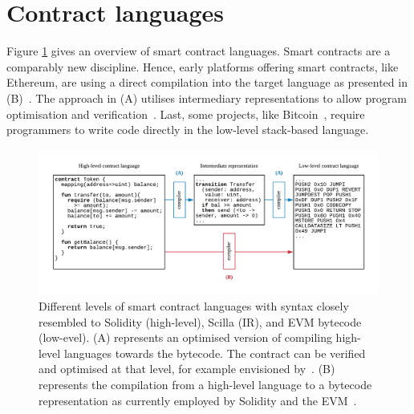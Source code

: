 \section{Contract languages}
\label{languages}

Figure \ref{fig:languagediagram} gives an overview of smart contract languages.
Smart contracts are a comparably new discipline.
Hence, early platforms offering smart contracts, like Ethereum, are using a direct compilation into the target language as presented in (B)~\cite{Ethereum2018Solidity,Ethereum2018Vyper}.
The approach in (A) utilises intermediary representations to allow program optimisation and verification~\cite{OCamlProSAS2018,DynamicLedgerSolutions2017,Sergey2018}. 
Last, some projects, like Bitcoin~\cite{BitcoinWiki2018Script}, require programmers to write code directly in the low-level stack-based language.





\begin{figure}
\includegraphics[width=\textwidth]{fig/Language.pdf}
\caption{Different levels of smart contract languages with syntax closely resembled to Solidity (high-level), Scilla (IR), and EVM bytecode (low-evel). (A) represents an optimised version of compiling high-level languages towards the bytecode. The contract can be verified and optimised at that level, for example envisioned by~\cite{Sergey2018,OCamlProSAS2018}. (B) represents the  compilation from a high-level language to a bytecode representation as currently employed by Solidity and the EVM~\cite{Ethereum2018Solidity,Wood2014}.}
\label{fig:languagediagram}
\end{figure}


